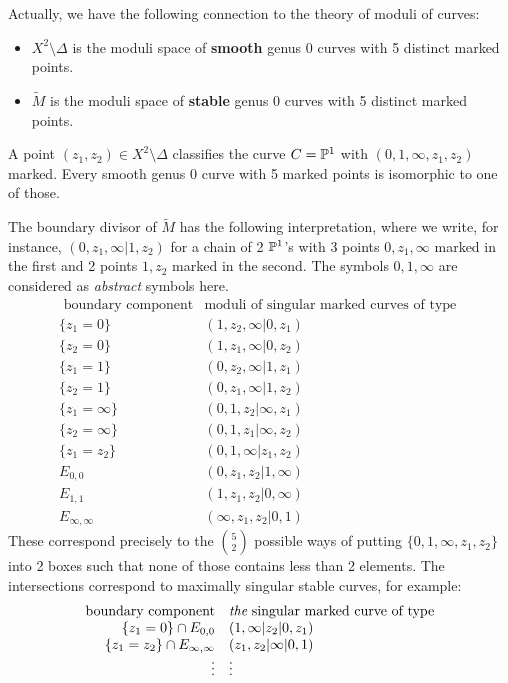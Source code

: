 Actually, we have the following connection to the theory of moduli of curves:

\begin{itemize}
\item
$X^2 \setminus \Delta$ is the moduli space of {\bf smooth} genus 0 curves with 5 distinct marked points.
\item
$\widetilde{M}$ is the moduli space of {\bf stable} genus 0 curves with 5 distinct marked points.
\end{itemize}
A point $(z_1,z_2) \in X^2 \setminus \Delta$ classifies the curve $C=\mathbb{P}^1$ with $(0,1,\infty,z_1,z_2)$ marked. Every smooth genus 0 curve with 5 marked points is isomorphic to one of those.

The boundary divisor of $\widetilde{M}$ has the following interpretation, where 
we write, for instance, $(0, z_1, \infty| 1, z_2)$ for a chain of 2 $\mathbb{P}^1$'s with 3 points $0,z_1,\infty$ marked in the first and 2 points $1, z_2$ marked in the second.
The symbols $0,1,\infty$ are considered as {\em abstract} symbols here.
\[
\begin{array}{rl}
\text{ boundary component} &  \text{moduli of singular marked curves of type }\\
\{z_1=0\} & (1,z_2,\infty|0,z_1) \\
\{z_2=0\} &  (1,z_1,\infty|0,z_2) \\
\{z_1=1\} &  (0,z_2,\infty|1,z_1) \\
\{z_2=1\} &  (0,z_1,\infty|1,z_2) \\
\{z_1=\infty\} &  (0,1,z_2|\infty,z_1) \\
\{z_2=\infty\} & (0,1,z_1|\infty,z_2) \\
\{z_1=z_2\} & (0,1,\infty|z_1,z_2) \\
E_{0,0} &  (0,z_1,z_2|1,\infty) \\
E_{1,1} &  (1,z_1,z_2|0,\infty) \\
E_{\infty,\infty} &  (\infty,z_1,z_2|0,1) 
\end{array}
\]
These correspond precisely to the ${5 \choose 2}$ possible ways of putting $\{ 0,1,\infty,z_1,z_2\}$ into 2 boxes such that none of those contains
less than 2 elements.
The intersections correspond to maximally singular stable curves, for example:
\[
\begin{array}{rl}
\text{ boundary component}&  \text{{\em the} singular marked curve of type }\\
\{z_1=0\} \cap E_{0,0} & (1,\infty|z_2|0,z_1) \\
\{z_1=z_2\} \cap E_{\infty,\infty} & (z_1,z_2|\infty|0,1) \\
\vdots & \vdots
\end{array}
\]

